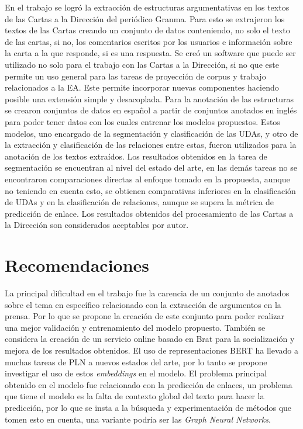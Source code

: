 \documentclass[a4paper,11pt,twocolumn,twoside]{article}
\begin{document}
En el trabajo se logró la extracción de estructuras argumentativas en los textos de las 
Cartas a la Dirección del periódico Granma. Para esto se 
extrajeron los textos de las Cartas creando un conjunto de datos
conteniendo, no solo el texto de las cartas, si no, los comentarios 
escritos por los usuarios e información sobre la carta a la que responde, si es una respuesta.
Se creó un software que puede ser utilizado no solo para el trabajo con las Cartas a la Dirección, si no
que este permite un uso general para las tareas de proyección de corpus y trabajo relacionados a la EA.
Este permite incorporar nuevas componentes haciendo posible una extensión simple y desacoplada. 
Para la anotación de las estructuras se crearon conjuntos de datos en español a partir de conjuntos 
anotados en inglés para poder 
tener datos con los cuales entrenar los modelos propuestos. Estos modelos, uno encargado 
de la segmentación y clasificación de las UDAs, y otro de la extracción y clasificación de las 
relaciones entre estas, fueron utilizados para la anotación de los textos extraídos.
Los resultados obtenidos en la tarea de segmentación se encuentran al nivel del estado del arte,
en las demás tareas no se encontraron comparaciones directas al enfoque tomado en la propuesta,
aunque no teniendo en cuenta esto, se obtienen comparativas inferiores en la clasificación
de UDAs y en la clasificación de relaciones, aunque se supera la métrica de predicción de enlace. 
Los resultados obtenidos del procesamiento de las Cartas a la Dirección son considerados 
aceptables por autor. 

\section{Recomendaciones}

La principal dificultad en el trabajo fue la carencia de un conjunto de anotados
sobre el tema en específico relacionado con la extracción de argumentos en la prensa.
Por lo que se propone la creación de este conjunto para poder realizar una mejor 
validación y entrenamiento del modelo propuesto. También se considera la creación de un servicio 
online basado en Brat para la socialización y mejora de los resultados obtenidos.
El uso de representaciones BERT ha llevado a muchas tareas de PLN a nuevos estados 
del arte, por lo tanto se propone investigar el uso de estos \textit{embeddings} en 
el modelo. El problema principal obtenido en el modelo fue relacionado con la 
predicción de enlaces, un problema que tiene el modelo es la falta de contexto global
del texto para hacer la predicción, por lo que se insta a la búsqueda y experimentación
de métodos que tomen esto en cuenta, una variante podría ser las \textit{Graph Neural Networks}.
\end{document}
